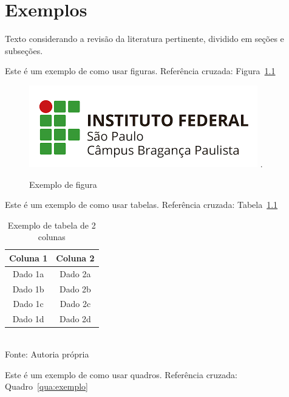 \chapter{Exemplos}
\label{cap:99}

Texto considerando a revisão da literatura pertinente, dividido em seções e subseções.

Este é um exemplo de como usar figuras. Referência cruzada: Figura~\ref{fig:exemplo}

\FloatBarrier
\begin{figure}[!htbp]
	\centering
	\caption{Exemplo de figura}
	\includegraphics[scale=1]{imagens/IFSP-BRA.png}
	.
	\label{fig:exemplo}
\end{figure}
\FloatBarrier


Este é um exemplo de como usar tabelas. Referência cruzada: Tabela~\ref{tab:exemplo}

\FloatBarrier
\begin{table}[!htbp]
\centering
\caption{Exemplo de tabela de 2 colunas}
	\begin{tabular}{ c | c }
		\hline
		\textbf{Coluna 1} & \textbf{Coluna 2} \\ \hline
		Dado 1a           & Dado 2a           \\ \hline
		Dado 1b           & Dado 2b           \\ \hline
		Dado 1c           & Dado 2c           \\ \hline
		Dado 1d           & Dado 2d           \\ \hline
	\end{tabular}
	\\ \vspace{0.2cm}
	Fonte: Autoria própria
	\label{tab:exemplo}
\end{table}
\FloatBarrier


Este é um exemplo de como usar quadros. Referência cruzada: Quadro~\ref{qua:exemplo}


